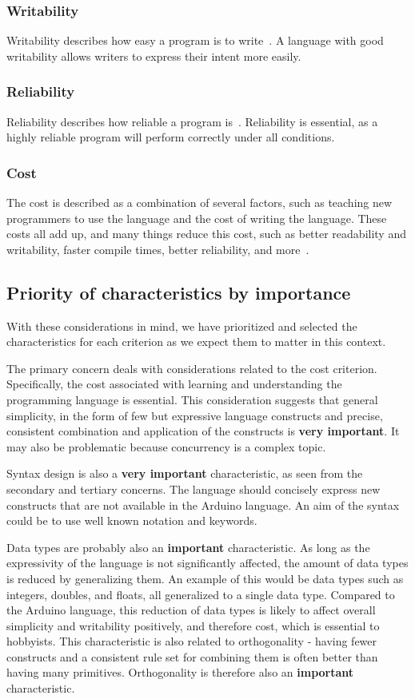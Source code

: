 \subsubsection{Writability}
Writability describes how easy a program is to write~\cite{Sebesta2016}. A language with good writability allows writers to express their intent more easily.

\subsubsection{Reliability}
Reliability describes how reliable a program is~\cite{Sebesta2016}. Reliability is essential, as a highly reliable program will perform correctly under all conditions.

\subsubsection{Cost}
The cost is described as a combination of several factors, such as teaching new programmers to use the language and the cost of writing the language. These costs all add up, and many things reduce this cost, such as better readability and writability, faster compile times, better reliability, and more~\cite{Sebesta2016}.

\subsection{Priority of characteristics by importance}
With these considerations in mind, we have prioritized and selected the characteristics for each criterion as we expect them to matter in this context.

The primary concern deals with considerations related to the cost criterion. Specifically, the cost associated with learning and understanding the programming language is essential. This consideration suggests that general simplicity, in the form of few but expressive language constructs and precise, consistent combination and application of the constructs is \textbf{very important}. It may also be problematic because concurrency is a complex topic.

Syntax design is also a \textbf{very important} characteristic, as seen from the secondary and tertiary concerns. The language should concisely express new constructs that are not available in the Arduino language. An aim of the syntax could be to use well known notation and keywords.

Data types are probably also an \textbf{important} characteristic. As long as the expressivity of the language is not significantly affected, the amount of data types is reduced by generalizing them. An example of this would be data types such as integers, doubles, and floats, all generalized to a single data type. Compared to the Arduino language, this reduction of data types is likely to affect overall simplicity and writability positively, and therefore cost, which is essential to hobbyists. This characteristic is also related to orthogonality - having fewer constructs and a consistent rule set for combining them is often better than having many primitives. Orthogonality is therefore also an \textbf{important} characteristic.


